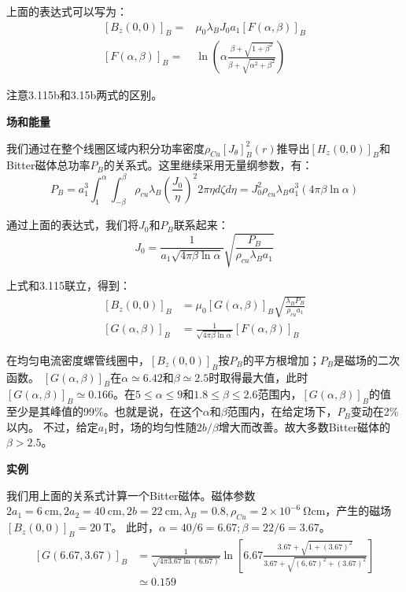 上面的表达式可以写为：
\begin{subequations}
	\begin{align}
{[B_z(0,0)]}_B=&\mu_0\lambda_B J_0a_1[F(\alpha,\beta)]_B\\ %
{[F(\alpha,\beta)]}_B=&\ln\left(\alpha\frac{\beta+\sqrt{1+\beta^2}}{\beta+\sqrt{\alpha^2+\beta^2}}\right)%
	\end{align}
\end{subequations}

注意3.115b和3.15b两式的区别。

\textbf{场和能量}

我们通过在整个线圈区域内积分功率密度$\rho_{Cu} [J_\theta]_B^2(r)$推导出$[H_z(0,0)]_B$和Bitter磁体总功率$P_B$的关系式。这里继续采用无量纲参数，有：
\begin{equation*}
P_B=a_1^3\int_{1}^{\alpha}\int_{-\beta}^{\beta}\rho_{cu}\lambda_B\left(\frac{J_0}{\eta}\right)^2 2\pi\eta d\zeta d\eta=J_0^2\rho_{cu}\lambda_B a_1^3(4\pi\beta\ln\alpha)%
\end{equation*}

通过上面的表达式，我们将$J_0$和$P_B$联系起来：
\begin{equation*}
J_0=\frac{1}{a_1\sqrt{4\pi\beta\ln\alpha}}\sqrt{\frac{P_B}{\rho_{cu}\lambda_B a_1}}%
\end{equation*}

上式和3.115联立，得到：
\begin{subequations}
	\begin{align}
{[B_z(0,0)]}_B&=\mu_0[G(\alpha,\beta)]_B\sqrt{\frac{\lambda_B P_B}{\rho_{cu}a_1}}\\%
{[G(\alpha,\beta)]}_B&=\frac{1}{\sqrt{4\pi\beta\ln\alpha}}[F(\alpha,\beta)]_B%
	\end{align}
\end{subequations}

在均匀电流密度螺管线圈中，$[B_z(0,0)]_B$按$P_B$的平方根增加；$P_B$是磁场的二次函数。
$[G(\alpha,\beta)]_B$在$\alpha\simeq 6.42$和$\beta\simeq 2.5$时取得最大值，此时$[G(\alpha,\beta)]_B\simeq 0.166$。在$5\leq \alpha \leq 9$和$1.8\leq\beta\leq 2.6$范围内，$[G(\alpha,\beta)]_B$的值
至少是其峰值的99\%。也就是说，在这个$\alpha$和$\beta$范围内，在给定场下，$P_B$变动在2\%以内。
不过，给定$a_1$时，场的均匀性随$2b/\beta$增大而改善。故大多数Bitter磁体的$\beta>2.5$。

\textbf{实例}

我们用上面的关系式计算一个Bitter磁体。磁体参数$2a_1=6\ \mathrm{cm}, 2a_2=40\ \mathrm{cm}, 2b=22 \ \mathrm{cm},\lambda_B=0.8, \rho_{Cu}=2\times10^{-6}\ \mathrm{\Omega cm}$，产生的磁场$[B_z(0,0)]_B=20\ \mathrm{T}$。
此时，$\alpha=40/6=6.67;\beta=22/6=3.67$。
\begin{equation*}
\begin{split}
{[G(6.67,3.67)]}_B&=\frac{1}{\sqrt{4\pi3.67\ln(6.67)}}\ln\left[6.67\frac{3.67+\sqrt{1+(3.67)^2}}{3.67+\sqrt{(6,67)^2+(3.67)^2}}\right]\\
&\simeq 0.159 %
\end{split}
\end{equation*}

